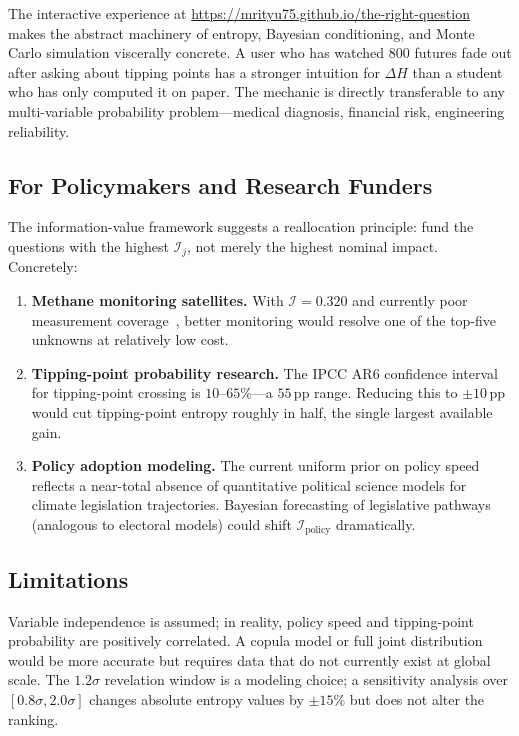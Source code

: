\documentclass[10pt,twocolumn]{article}
\begin{document}
The interactive experience at \url{https://mrityu75.github.io/the-right-question}
makes the abstract machinery of entropy, Bayesian conditioning,
and Monte Carlo simulation viscerally concrete.  A user who has
watched 800 futures fade out after asking about tipping points
has a stronger intuition for $\Delta H$ than a student who has only
computed it on paper.  The mechanic is directly transferable to
any multi-variable probability problem---medical diagnosis,
financial risk, engineering reliability.

\subsection{For Policymakers and Research Funders}

The information-value framework suggests a reallocation principle:
fund the questions with the highest $\mathcal{I}_j$, not merely the
highest nominal impact.  Concretely:

\begin{enumerate}[leftmargin=*,itemsep=2pt]
  \item \textbf{Methane monitoring satellites.}  With $\mathcal{I}=0.320$
  and currently poor measurement coverage~\cite{owid_methane}, better
  monitoring would resolve one of the top-five unknowns at relatively
  low cost.
  \item \textbf{Tipping-point probability research.}  The IPCC AR6
  confidence interval for tipping-point crossing is $10$--$65\%$---a
  $55$\,pp range.  Reducing this to $\pm10$\,pp would cut tipping-point
  entropy roughly in half, the single largest available gain.
  \item \textbf{Policy adoption modeling.}  The current uniform
  prior on policy speed reflects a near-total absence of quantitative
  political science models for climate legislation trajectories.
  Bayesian forecasting of legislative pathways (analogous to electoral
  models) could shift $\mathcal{I}_{\text{policy}}$ dramatically.
\end{enumerate}

\subsection{Limitations}

Variable independence is assumed; in reality, policy speed and
tipping-point probability are positively correlated.  A copula model
or full joint distribution would be more accurate but requires data
that do not currently exist at global scale.  The $1.2\sigma$
revelation window is a modeling choice; a sensitivity analysis over
$[0.8\sigma, 2.0\sigma]$ changes absolute entropy values by $\pm15\%$
but does not alter the ranking.
\end{document}
